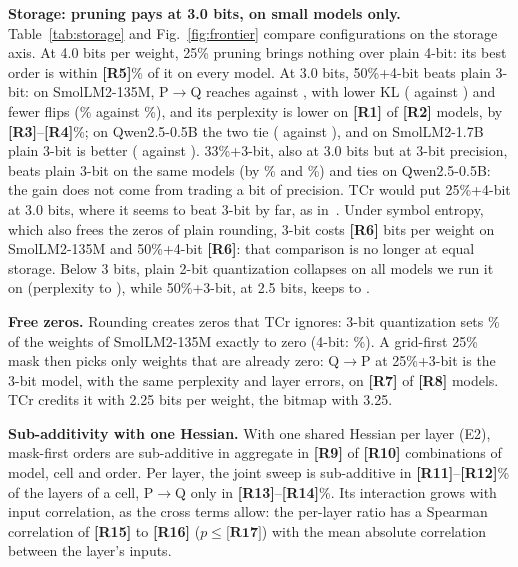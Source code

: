 \documentclass{esannV2}
\newcommand{\TBD}[1]{\textbf{[#1]}}
\providecommand{\resFrontierThreeWins}{\TBD{R1}}
\providecommand{\resFrontierThreeModels}{\TBD{R2}}
\providecommand{\resFrontierThreeGainMinPct}{\TBD{R3}}
\providecommand{\resFrontierThreeGainMaxPct}{\TBD{R4}}
\providecommand{\resFrontierFourGapMaxPct}{\TBD{R5}}
\providecommand{\resBitsSymSmolSmallQuantBThree}{\TBD{R6}}
\providecommand{\resBitsSymSmolSmallSFiftyBFourPQ}{\TBD{R6}}
\providecommand{\resIdentityQPThreeCount}{\TBD{R7}}
\providecommand{\resIdentityQPThreeModels}{\TBD{R8}}
\providecommand{\resETwoMaskFirstSub}{\TBD{R9}}
\providecommand{\resETwoMaskFirstTotal}{\TBD{R10}}
\providecommand{\resETwoSubJointMinPct}{\TBD{R11}}
\providecommand{\resETwoSubJointMaxPct}{\TBD{R12}}
\providecommand{\resETwoSubPQMinPct}{\TBD{R13}}
\providecommand{\resETwoSubPQMaxPct}{\TBD{R14}}
\providecommand{\resETwoRhoMin}{\TBD{R15}}
\providecommand{\resETwoRhoMax}{\TBD{R16}}
\providecommand{\resETwoRhoPMax}{\TBD{R17}}
\begin{document}
\textbf{Storage: pruning pays at 3.0 bits, on small models only.}
Table~\ref{tab:storage} and Fig.~\ref{fig:frontier} compare configurations
on the storage axis. At 4.0 bits per weight, 25\% pruning brings nothing over
plain 4-bit: its best order is within \resFrontierFourGapMaxPct\% of it on every
model. At
3.0 bits, 50\%+4-bit beats plain 3-bit: on SmolLM2-135M, P$\to$Q reaches
\resPplSmolSmallSFiftyBFourPQ{} against \resPplSmolSmallQuantBThree, with
lower KL (\resKlSmolSmallSFiftyBFourPQ{} against \resKlSmolSmallQuantBThree)
and fewer flips (\resFlipsPctSmolSmallSFiftyBFourPQ\% against
\resFlipsPctSmolSmallQuantBThree\%), and its perplexity is lower on
\resFrontierThreeWins{} of \resFrontierThreeModels{} models, by
\resFrontierThreeGainMinPct--\resFrontierThreeGainMaxPct\%; on Qwen2.5-0.5B
the two tie (\resPplQwenSFiftyBFourJoint{} against \resPplQwenQuantBThree),
and on SmolLM2-1.7B plain 3-bit is better (\resPplSmolLargeQuantBThree{}
against \resPplSmolLargeSFiftyBFourPQ). 33\%+3-bit, also at 3.0 bits but at
3-bit precision, beats plain 3-bit on the same \resFrontierThreeBThreeWins{}
models (by \resFrontierThreeBThreeGainSmolSmallPct\% and
\resFrontierThreeBThreeGainSmolMediumPct\%) and ties on Qwen2.5-0.5B: the gain
does not come from trading a bit of precision. TCr would put
25\%+4-bit at 3.0 bits, where it seems to beat 3-bit by far, as
in~\cite{laborde2025semantic}. Under symbol entropy, which also frees the
zeros of plain rounding, 3-bit costs \resBitsSymSmolSmallQuantBThree{} bits
per weight on SmolLM2-135M and 50\%+4-bit \resBitsSymSmolSmallSFiftyBFourPQ:
that comparison is no longer at equal storage. Below 3 bits, plain 2-bit
quantization collapses on all \resQuantTwoModels{} models we run it on
(perplexity \resQuantTwoPplMin{} to \resQuantTwoPplMax), while 50\%+3-bit,
at 2.5 bits, keeps \resSFiftyBThreeBestPplMin{} to \resSFiftyBThreeBestPplMax.

\textbf{Free zeros.} Rounding creates zeros that TCr ignores: 3-bit
quantization sets \resFreeZerosPctSmolSmallQuantBThree\% of the weights of
SmolLM2-135M exactly to zero (4-bit: \resFreeZerosPctSmolSmallQuantBFour\%).
A grid-first 25\% mask then picks only weights that are already zero: Q$\to$P
at 25\%+3-bit is the 3-bit model, with the same perplexity and layer errors,
on \resIdentityQPThreeCount{} of \resIdentityQPThreeModels{} models. TCr
credits it with 2.25 bits per weight, the bitmap with 3.25.

\textbf{Sub-additivity with one Hessian.} With one shared Hessian per
layer (E2), mask-first orders are sub-additive in aggregate in
\resETwoMaskFirstSub{} of \resETwoMaskFirstTotal{} combinations of model, cell
and order. Per layer, the joint sweep
is sub-additive in \resETwoSubJointMinPct--\resETwoSubJointMaxPct\% of the
layers of a cell, P$\to$Q only in \resETwoSubPQMinPct--\resETwoSubPQMaxPct\%.
Its interaction grows with input correlation, as the cross terms allow: the
per-layer ratio has a Spearman correlation of \resETwoRhoMin{} to
\resETwoRhoMax{} ($p\le\resETwoRhoPMax$) with the mean absolute correlation
between the layer's inputs.
\end{document}
